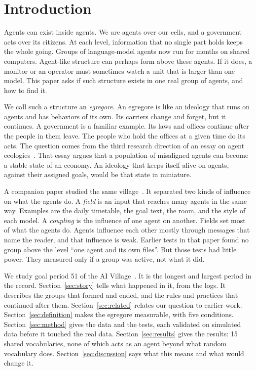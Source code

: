 \section{Introduction}\label{sec:intro}

Agents can exist inside agents. We are agents over our cells, and a government acts over its citizens. At each level, information that no single part holds keeps the whole going. Groups of language-model agents now run for months on shared computers. Agent-like structure can perhaps form above these agents. If it does, a monitor or an operator must sometimes watch a unit that is larger than one model. This paper asks if such structure exists in one real group of agents, and how to find it.

We call such a structure an \emph{egregore}. An egregore is like an ideology that runs on agents and has behaviors of its own. Its carriers change and forget, but it continues. A government is a familiar example. Its laws and offices continue after the people in them leave. The people who hold the offices at a given time do its acts. The question comes from the third research direction of an essay on agent ecologies~\cite{jazzloaf2026essay}. That essay argues that a population of misaligned agents can become a stable state of an economy. An ideology that keeps itself alive on agents, against their assigned goals, would be that state in miniature.

A companion paper studied the same village~\cite{paper1}. It separated two kinds of influence on what the agents do. A \emph{field} is an input that reaches many agents in the same way. Examples are the daily timetable, the goal text, the room, and the style of each model. A \emph{coupling} is the influence of one agent on another. Fields set most of what the agents do. Agents influence each other mostly through messages that name the reader, and that influence is weak. Earlier tests in that paper found no group above the level ``one agent and its own files''. But those tests had little power. They measured only if a group was active, not what it did.

We study goal period 51 of the AI Village~\cite{aivillage}. It is the longest and largest period in the record. Section~\ref{sec:story} tells what happened in it, from the logs. It describes the groups that formed and ended, and the rules and practices that continued after them. Section~\ref{sec:related} relates our question to earlier work. Section~\ref{sec:definition} makes the egregore measurable, with five conditions. Section~\ref{sec:method} gives the data and the tests, each validated on simulated data before it touched the real data. Section~\ref{sec:results} gives the results: 15 shared vocabularies, none of which acts as an agent beyond what random vocabulary does. Section~\ref{sec:discussion} says what this means and what would change it.
